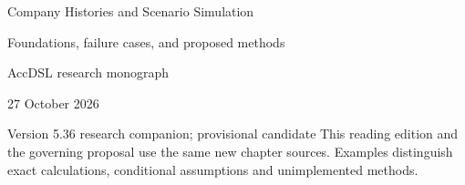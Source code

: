\documentclass[11pt,a4paper]{report}
\begin{document}
\hypersetup{pageanchor=false}
\begin{titlepage}
{\Huge Company Histories and Scenario Simulation\par}
\vspace{12mm}
{\Large Foundations, failure cases, and proposed methods\par}
\vspace{8mm}
AccDSL research monograph\par 27 October 2026\par Version 5.36 research companion; provisional candidate
\vfill
This reading edition and the governing proposal use the same new chapter sources. Examples distinguish exact calculations, conditional assumptions and unimplemented methods.
\end{titlepage}
\hypersetup{pageanchor=true}
\tableofcontents
\clearpage{}


























\clearpage\label{sim:body-end}

\begingroup\raggedright
\endgroup
\end{document}
